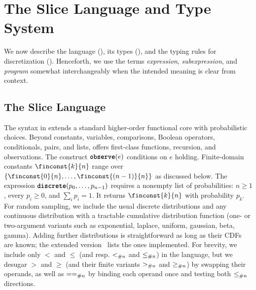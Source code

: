 \section{The Slice Language and Type System}\label{sec:language}
We now describe the language (), its types (), and the typing rules for discretization (). Henceforth, we use the terms \emph{expression}, \emph{subexpression}, and \emph{program} somewhat interchangeably when the intended meaning is clear from context.

\subsection{The Slice Language}
\label{sec:sub_language}
%

%
The syntax in  extends a standard higher-order functional core with probabilistic choices. Beyond constants, variables, comparisons, Boolean operators, conditionals, pairs, and lists, \Slice{} offers first-class functions, recursion, and observations. The construct $\textnormal{\ttfamily\bfseries observe}(e)$ conditions on $e$ holding. Finite-domain constants $\finconst{k}{n}$ range over $\{\finconst{0}{n},\ldots,\finconst{(n-1)}{n}\}$ as discussed below. The expression $\textnormal{\ttfamily\bfseries discrete}(p_0,\ldots,p_{n-1})$ requires a nonempty list of probabilities: $n \geq 1$, every $p_i \geq 0$, and $\sum_i p_i = 1$. It returns $\finconst{k}{n}$ with probability $p_k$. For random sampling, we include the usual discrete distributions and any continuous distribution with a tractable cumulative distribution function (one- or two-argument variants such as exponential, laplace, uniform, gaussian, beta, gamma). Adding further distributions is straightforward as long as their CDFs are known; the extended version~\cite[\S~C]{Wu2026SliceExtended} lists the ones implemented. For brevity, we include only $<$ and $\leq$ (and resp. $<_{\#{n}}$ and $\leq_{\#{n}}$) in the language, but we desugar $>$ and $\geq$ (and their finite variants $>_{\#{n}}$ and $\geq_{\#{n}}$) by swapping their operands, as well as $==_{\#{n}}$ by binding each operand once and testing both $\leq_{\#{n}}$ directions.




